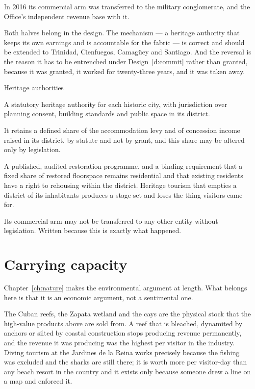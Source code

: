 In 2016 its commercial arm was transferred to the military conglomerate, and the
Office's independent revenue base with it.

Both halves belong in the design. The mechanism --- a heritage authority that
keeps its own earnings and is accountable for the fabric --- is correct and
should be extended to Trinidad, Cienfuegos, Camag\"uey and Santiago. And the
reversal is the reason it has to be entrenched under Design~\ref{d:commit}
rather than granted, because it was granted, it worked for twenty-three years,
and it was taken away.

\begin{design}{Heritage authorities}
\label{d:heritage}
\begin{rules}
 A statutory heritage authority for each historic city, with
jurisdiction over planning consent, building standards and public space in its
district.

 It retains a defined share of the accommodation levy and of
concession income raised in its district, by statute and not by grant, and this
share may be altered only by legislation.

 A published, audited restoration programme, and a binding
requirement that a fixed share of restored floorspace remains residential and
that existing residents have a right to rehousing within the district. Heritage
tourism that empties a district of its inhabitants produces a stage set and
loses the thing visitors came for.

 Its commercial arm may not be transferred to any other
entity without legislation. Written because this is exactly what happened.
\end{rules}
\end{design}

\section{Carrying capacity}

Chapter~\ref{ch:nature} makes the environmental argument at length. What belongs
here is that it is an economic argument, not a sentimental one.

The Cuban reefs, the Zapata wetland and the cays are the physical stock that the
high-value products above are sold from. A reef that is bleached, dynamited by
anchors or silted by coastal construction stops producing revenue permanently,
and the revenue it was producing was the highest per visitor in the industry.
Diving tourism at the Jardines de la Reina works precisely because the fishing
was excluded and the sharks are still there; it is worth more per visitor-day
than any beach resort in the country and it exists only because someone drew a
line on a map and enforced it.


